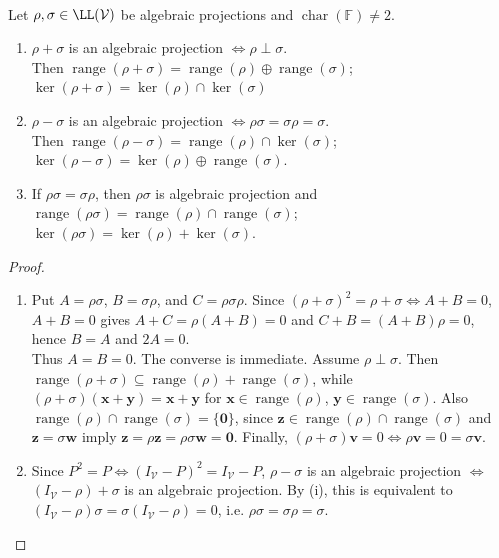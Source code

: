 \begin{theorem} \label{thm:algebra-of-projections} \\
Let $\rho,\sigma\in\LL(\mathcal{V})$ be algebraic projections and $\operatorname{char}(\mathbb{F})\neq2$.
\begin{enumerate}[label=(\roman*)]
\setlength{\itemsep}{0pt}
\item $\rho+\sigma$ is an algebraic projection $\Longleftrightarrow \rho\perp\sigma$.\\
Then $\operatorname{range}(\rho+\sigma)=\operatorname{range}(\rho)\oplus\operatorname{range}(\sigma)$; $\ker(\rho+\sigma)=\ker(\rho)\cap\ker(\sigma)$
\item $\rho-\sigma$ is an algebraic projection $\Longleftrightarrow \rho\sigma=\sigma\rho=\sigma$.\\
Then $\operatorname{range}(\rho-\sigma)=\operatorname{range}(\rho)\cap\ker(\sigma)$; $\ker(\rho-\sigma)=\ker(\rho)\oplus\operatorname{range}(\sigma)$.
\item If $\rho\sigma=\sigma\rho$, then $\rho\sigma$ is algebraic projection and $\operatorname{range}(\rho\sigma)=\operatorname{range}(\rho)\cap\operatorname{range}(\sigma)$; $\ker(\rho\sigma)=\ker(\rho)+\ker(\sigma)$.
\end{enumerate}
\begin{proof}
\begin{enumerate}[label=(\roman*)]
\setlength{\itemsep}{0pt}
\item Put $A=\rho\sigma$, $B=\sigma\rho$, and $C=\rho\sigma\rho$. Since $(\rho+\sigma)^2=\rho+\sigma \Longleftrightarrow A+B=0$,\\
$A+B=0$ gives $A+C=\rho(A+B)=0$ and $C+B=(A+B)\rho=0$, hence $B=A$ and $2A=0$.\\
Thus $A=B=0$. The converse is immediate. Assume $\rho\perp\sigma$. Then $\operatorname{range}(\rho+\sigma)\subseteq\operatorname{range}(\rho)+\operatorname{range}(\sigma)$, while $(\rho+\sigma)(\mathbf{x}+\mathbf{y})=\mathbf{x}+\mathbf{y}$ for $\mathbf{x}\in\operatorname{range}(\rho)$, $\mathbf{y}\in\operatorname{range}(\sigma)$. Also $\operatorname{range}(\rho)\cap\operatorname{range}(\sigma)=\{\mathbf{0}\}$, since $\mathbf{z}\in\operatorname{range}(\rho)\cap\operatorname{range}(\sigma)$ and $\mathbf{z}=\sigma\mathbf{w}$ imply $\mathbf{z}=\rho\mathbf{z}=\rho\sigma\mathbf{w}=\mathbf{0}$. Finally, $(\rho+\sigma)\mathbf{v}=0 \Longleftrightarrow \rho\mathbf{v}=0=\sigma\mathbf{v}$.
\item Since $P^2=P\Longleftrightarrow (I_{\mathcal{V}}-P)^2=I_{\mathcal{V}}-P$, $\rho-\sigma$ is an algebraic projection $\Longleftrightarrow$ $(I_{\mathcal{V}}-\rho)+\sigma$ is an algebraic projection. By (i), this is equivalent to $(I_{\mathcal{V}}-\rho)\sigma=\sigma(I_{\mathcal{V}}-\rho)=0$, i.e. $\rho\sigma=\sigma\rho=\sigma$.\\

\end{enumerate}
\end{proof}
\end{theorem}
